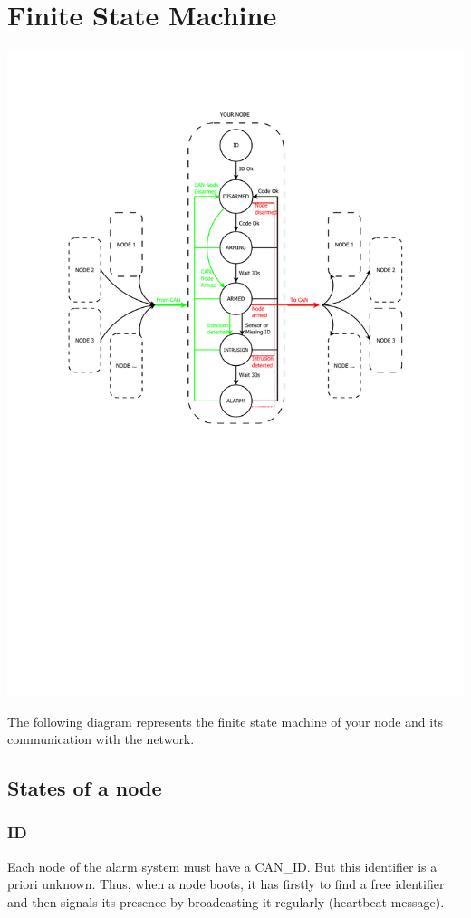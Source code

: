 \documentclass[10pt,a4paper]{article}
\theoremstyle{definition}%
\begin{document}
\section{Finite State Machine}
 \begin{center}
 \includegraphics[width=16cm]{FSM_Proj_410.pdf}
 \end{center}

The following diagram represents the finite state machine of your node and its communication with the network. 

\subsection{States of a node}
 \subsubsection{ID}
  Each node of the alarm system must have a CAN\_ID. But this identifier is a priori unknown. Thus, when a node boots, it has firstly to find a free identifier and then signals its presence by broadcasting it regularly (heartbeat message).\\
	
\end{document}
